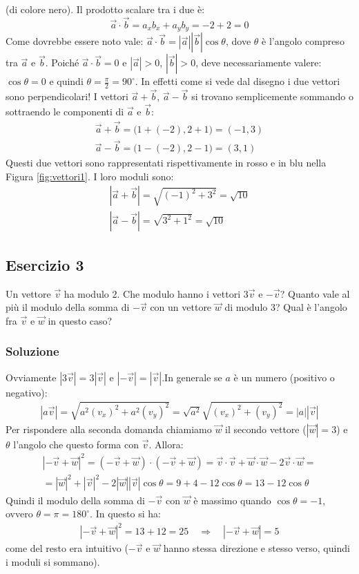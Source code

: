 \documentclass[12pt,a4paper]{book}
\begin{document}
(di colore nero).  Il prodotto scalare tra i due è:
\begin{equation*}
\vec{a} \cdot \vec{b}=a_x b_x + a_y b_y=-2+2=0
\end{equation*}
Come dovrebbe essere noto vale: $\vec{a} \cdot \vec{b}=|\vec{a}|| \vec{b}|\cos \theta$, dove $\theta$ è l'angolo compreso tra $\vec{a}$ e $\vec{b}$. Poiché  $\vec{a} \cdot \vec{b}=0$ e $|\vec{a}|>0$, $|\vec{b}|>0$, deve necessariamente valere: 
$\cos \theta=0$ e quindi $\theta=\frac{\pi}{2}=90^{\circ}$. In effetti come si vede dal disegno i due vettori sono perpendicolari!
I vettori $\vec{a}+\vec{b}$, $\vec{a}-\vec{b}$ si trovano semplicemente sommando o sottraendo le componenti di $\vec{a}$ e $\vec{b}$:
\begin{gather*}
\vec{a}+\vec{b}=\big(1+(-2), 2+1\big)=(-1,3)\\
\vec{a}-\vec{b}=\big(1-(-2), 2-1\big)=(3,1)
\end{gather*}
Questi due vettori sono rappresentati rispettivamente in rosso e in blu nella Figura \ref{fig:vettori1}. I loro moduli sono:
\begin{gather*}
|\vec{a}+\vec{b}|=\sqrt{(-1)^2+3^2}=\sqrt{10}\\
|\vec{a}-\vec{b}|=\sqrt{3^2+1^2}=\sqrt{10}
\end{gather*}

\subsection*{Esercizio 3}
Un vettore $\vec{v}$ ha modulo 2. Che modulo hanno i vettori $3\vec{v}$ e $-\vec{v}$? Quanto vale al più il modulo della somma di $-\vec{v}$ con un vettore $\vec{w}$ di modulo 3? Qual è l'angolo fra $\vec{v}$ e $\vec{w}$ in questo caso?
\subsubsection*{Soluzione}
Ovviamente $|3\vec{v}|=3|\vec{v}|$ e $|-\vec{v}|=|\vec{v}|$.In generale se $a$ è un numero (positivo o negativo):
\begin{gather*}
|a\vec{v}|=\sqrt{a^2 (v_x)^2+ a^2 (v_y)^2}=\sqrt{a^2} \sqrt{(v_x)^2+(v_y)^2}=|a||\vec{v}|
\end{gather*}
Per rispondere alla seconda domanda chiamiamo $\vec{w}$ il secondo vettore ($|\vec{w}|=3$) e $\theta$ l'angolo che questo forma con $\vec{v}$. Allora:
\begin{gather*}
|-\vec{v}+\vec{w}|^2=(-\vec{v}+\vec{w})\cdot (-\vec{v}+\vec{w})= \vec{v}\cdot \vec{v} + \vec{w}\cdot \vec{w} - 2 \vec{v}\cdot \vec{w}=\\
=|\vec{w}|^2 + |\vec{v}|^2 - 2|\vec{w}||\vec{v}|\cos \theta= 9 + 4 - 12\cos \theta=13-12\cos \theta
\end{gather*}
Quindi il modulo della somma di $-\vec{v}$ con $\vec{w}$ è massimo quando $\cos \theta=-1$, ovvero $\theta=\pi=180^{\circ}$. In questo si ha:
\begin{gather*}
|-\vec{v}+\vec{w}|^2=13+12=25 \quad \Rightarrow \quad |-\vec{v}+\vec{w}|=5
\end{gather*}
come del resto era intuitivo ($-\vec{v}$ e $\vec{w}$ hanno stessa direzione e stesso verso, quindi i moduli si sommano).
\end{document}
